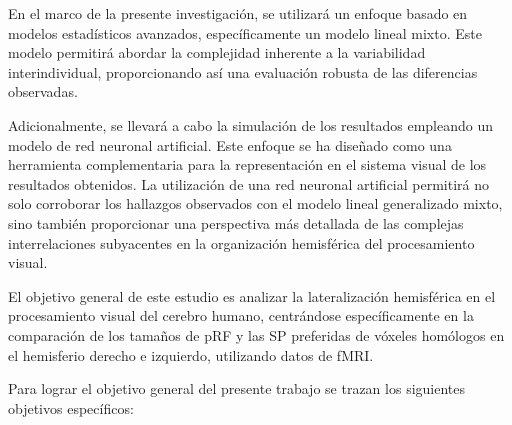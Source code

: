 
En el marco de la presente investigación, se utilizará un enfoque basado en modelos estadísticos avanzados, específicamente un modelo lineal mixto. Este modelo permitirá abordar la complejidad inherente a la variabilidad interindividual, proporcionando así una evaluación robusta de las diferencias observadas.

Adicionalmente, se llevará a cabo la simulación de los resultados empleando un modelo de red neuronal artificial. Este enfoque se ha diseñado como una herramienta complementaria para la representación en el sistema visual de los resultados obtenidos. La utilización de una red neuronal artificial permitirá no solo corroborar los hallazgos observados con el modelo lineal generalizado mixto, sino también proporcionar una perspectiva más detallada de las complejas interrelaciones subyacentes en la organización hemisférica del procesamiento visual.

El objetivo general de este estudio es analizar la lateralización hemisférica en el procesamiento visual del cerebro humano, centrándose específicamente en la comparación de los tamaños de pRF y las SP preferidas de v\'oxeles hom\'ologos en el hemisferio derecho e izquierdo, utilizando datos de fMRI.

Para lograr el objetivo general del presente trabajo se
trazan los siguientes objetivos específicos:

